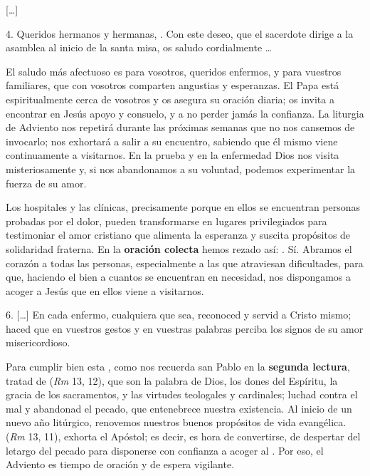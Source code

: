 \begin{body}
	{[}\ldots{}{]} 
	
	4. Queridos hermanos y hermanas, . Con este deseo, que el sacerdote dirige a la asamblea al inicio de la santa misa, os saludo cordialmente \ldots{} 
	
	El saludo más afectuoso es para vosotros, queridos enfermos, y para vuestros familiares, que con vosotros comparten angustias y esperanzas. El Papa está espiritualmente cerca de vosotros y os asegura su oración diaria; os invita a encontrar en Jesús apoyo y consuelo, y a no perder jamás la confianza. La liturgia de Adviento nos repetirá durante las próximas semanas que no nos cansemos de invocarlo; nos exhortará a salir a su encuentro, sabiendo que él mismo viene continuamente a visitarnos. En la prueba y en la enfermedad Dios nos visita misteriosamente y, si nos abandonamos a su voluntad, podemos experimentar la fuerza de su amor. 
	
	Los hospitales y las clínicas, precisamente porque en ellos se encuentran personas probadas por el dolor, pueden transformarse en lugares privilegiados para testimoniar el amor cristiano que alimenta la esperanza y suscita propósitos de solidaridad fraterna. En la \textbf{oración colecta} hemos rezado así: . Sí. Abramos el corazón a todas las personas, especialmente a las que atraviesan dificultades, para que, haciendo el bien a cuantos se encuentran en necesidad, nos dispongamos a acoger a Jesús que en ellos viene a visitarnos. 
	
	6. [\ldots{}] En cada enfermo, cualquiera que sea, reconoced y servid a Cristo mismo; haced que en vuestros gestos y en vuestras palabras perciba los signos de su amor misericordioso. 
	
	Para cumplir bien esta , como nos recuerda san Pablo en la \textbf{segunda lectura}, tratad de  (\emph{Rm} 13, 12), que son la palabra de Dios, los dones del Espíritu, la gracia de los sacramentos, y las virtudes teologales y cardinales; luchad contra el mal y abandonad el pecado, que entenebrece nuestra existencia. Al inicio de un nuevo año litúrgico, renovemos nuestros buenos propósitos de vida evangélica.  (\emph{Rm} 13, 11), exhorta el Apóstol; es decir, es hora de convertirse, de despertar del letargo del pecado para disponerse con confianza a acoger al . Por eso, el Adviento es tiempo de oración y de espera vigilante. 
	

\end{body}
